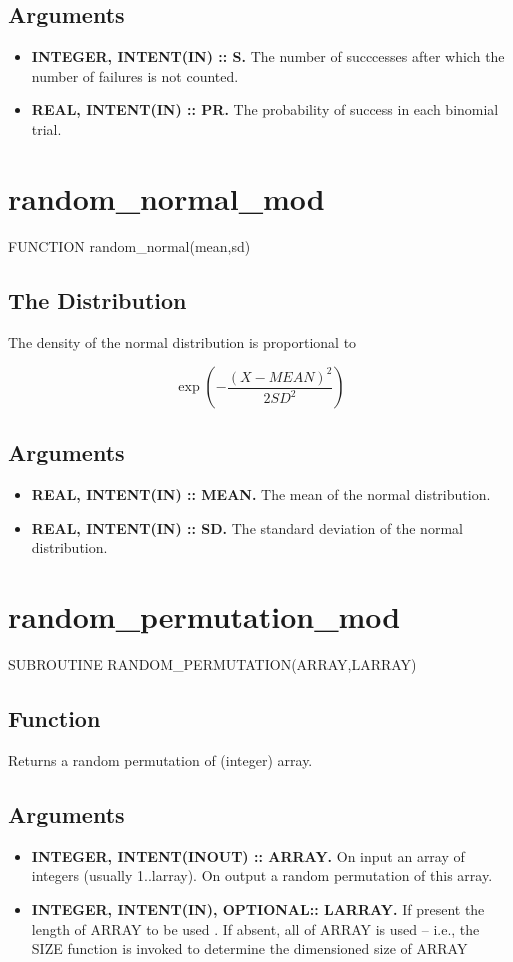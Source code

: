 \documentclass[12pt,dvips]{article}
\newcommand{\mysection}[1]{\color{blue}
            \section{#1} \normalcolor}
\newcommand{\mysubsection}[1] {\color{green}
            \subsection{#1} \normalcolor}
\newcommand{\myitem}[1]{\item{\bf \color{Violet} #1 \normalcolor}}
\begin{document}
\mysubsection{Arguments}

\begin{itemize}

\myitem{INTEGER, INTENT(IN) :: S.}  The number of succcesses after which
the number of failures is not counted.

\myitem{REAL, INTENT(IN) :: PR.} The probability of success in each
binomial trial.

\end{itemize}

\pagebreak

\mysection{random\_normal\_mod}

FUNCTION random\_normal(mean,sd)

\mysubsection{The Distribution}

The density of the normal distribution is proportional to

\[ \exp\left(-\frac{(X-MEAN)^2}{2 SD^2}\right) \]

\mysubsection{Arguments}

\begin{itemize}

\myitem{REAL, INTENT(IN) :: MEAN.} The mean of the normal distribution.

\myitem{REAL, INTENT(IN) :: SD.} The standard deviation of the normal
distribution.

\end{itemize}

\pagebreak

\mysection{random\_permutation\_mod}

SUBROUTINE RANDOM\_PERMUTATION(ARRAY,LARRAY)

\mysubsection{Function}

Returns a random permutation of (integer) array.

\mysubsection{Arguments}

\begin{itemize}

\myitem{INTEGER, INTENT(INOUT) :: ARRAY.}  On input an array of integers
(usually 1..larray).  On output a random permutation of this array.

\myitem{INTEGER, INTENT(IN),  OPTIONAL:: LARRAY.} If  present the length
of ARRAY to  be used .  If absent,  all of ARRAY is used  -- i.e., the
SIZE function is invoked to determine the dimensioned size of ARRAY

\end{itemize}

\pagebreak
\end{document}
